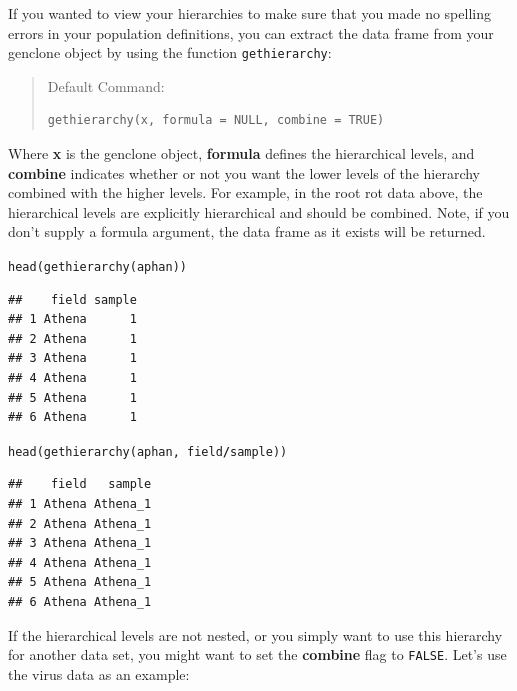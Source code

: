 \documentclass[letterpaper]{article}\usepackage[]{graphicx}\usepackage[]{color}
\makeatletter
\newcommand{\hlopt}[1]{\textcolor[rgb]{1,0,0.502}{\textbf{#1}}}%
\newcommand{\hlstd}[1]{\textcolor[rgb]{0,0,0}{#1}}%
\newcommand{\hlkwd}[1]{\textcolor[rgb]{0,0.267,0.4}{#1}}%
\newenvironment{kframe}{%
 \def\at@end@of@kframe{}%
 \ifinner\ifhmode%
  \def\at@end@of@kframe{\end{minipage}}%
  \begin{minipage}{\columnwidth}%
 \fi\fi%
 \def\FrameCommand##1{\hskip\@totalleftmargin \hskip-\fboxsep
 \colorbox{shadecolor}{##1}\hskip-\fboxsep
     \hskip-\linewidth \hskip-\@totalleftmargin \hskip\columnwidth}%
 \MakeFramed {\advance\hsize-\width
   \@totalleftmargin\z@ \linewidth\hsize
   \@setminipage}}%
 {\par\unskip\endMakeFramed%
 \at@end@of@kframe}
\newenvironment{knitrout}{}{} %
\makeatother
\begin{document}
If you wanted to view your hierarchies to make sure that you made no spelling
errors in your population definitions, you can extract the data frame from your
genclone object by using the function \texttt{gethierarchy}:

\begin{quote}
Default Command:
\begin{knitrout}
\color{fgcolor}\begin{kframe}
\begin{verbatim}
gethierarchy(x, formula = NULL, combine = TRUE)
\end{verbatim}
\end{kframe}
\end{knitrout}

\end{quote}
\noindent
Where \textbf{x} is the genclone object, \textbf{formula} defines the hierarchical
levels, and \textbf{combine} indicates whether or not you want the lower levels 
of the hierarchy combined with the higher levels. For example, in the root rot
data above, the hierarchical levels are explicitly hierarchical and should be
combined. Note, if you don't supply a formula argument, the data frame as it
exists will be returned.

\begin{knitrout}\footnotesize
{}\color{fgcolor}\begin{kframe}
\begin{alltt}
\hlkwd{head}\hlstd{(}\hlkwd{gethierarchy}\hlstd{(aphan))}
\end{alltt}
\begin{verbatim}
##    field sample
## 1 Athena      1
## 2 Athena      1
## 3 Athena      1
## 4 Athena      1
## 5 Athena      1
## 6 Athena      1
\end{verbatim}
\begin{alltt}
\hlkwd{head}\hlstd{(}\hlkwd{gethierarchy}\hlstd{(aphan,} \hlopt{~}\hlstd{field}\hlopt{/}\hlstd{sample))}
\end{alltt}
\begin{verbatim}
##    field   sample
## 1 Athena Athena_1
## 2 Athena Athena_1
## 3 Athena Athena_1
## 4 Athena Athena_1
## 5 Athena Athena_1
## 6 Athena Athena_1
\end{verbatim}
\end{kframe}
\end{knitrout}


If the hierarchical levels are not nested, or you simply want to use this
hierarchy for another data set, you might want to set the \textbf{combine} flag
to \texttt{FALSE}. Let's use the virus data as an example:
\end{document}
